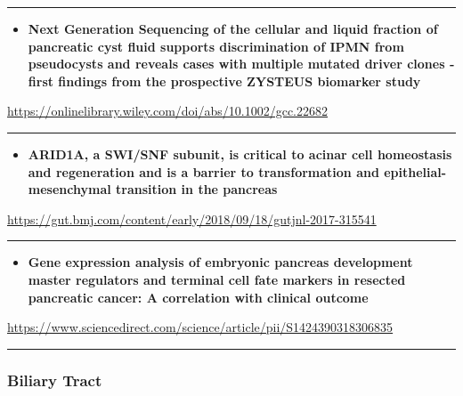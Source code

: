 \documentclass[]{article}
\providecommand{\tightlist}{%
  \setlength{\itemsep}{0pt}\setlength{\parskip}{0pt}}
\begin{document}
{}

{}

\begin{center}\rule{0.5\linewidth}{\linethickness}\end{center}

\begin{itemize}
\tightlist
\item
  \textbf{Next Generation Sequencing of the cellular and liquid fraction
  of pancreatic cyst fluid supports discrimination of IPMN from
  pseudocysts and reveals cases with multiple mutated driver clones ‐
  first findings from the prospective ZYSTEUS biomarker study}
\end{itemize}

\url{https://onlinelibrary.wiley.com/doi/abs/10.1002/gcc.22682}

\begin{center}\rule{0.5\linewidth}{\linethickness}\end{center}

\begin{itemize}
\tightlist
\item
  \textbf{ARID1A, a SWI/SNF subunit, is critical to acinar cell
  homeostasis and regeneration and is a barrier to transformation and
  epithelial-mesenchymal transition in the pancreas}
\end{itemize}

\url{https://gut.bmj.com/content/early/2018/09/18/gutjnl-2017-315541}

\begin{center}\rule{0.5\linewidth}{\linethickness}\end{center}

\begin{itemize}
\tightlist
\item
  \textbf{Gene expression analysis of embryonic pancreas development
  master regulators and terminal cell fate markers in resected
  pancreatic cancer: A correlation with clinical outcome}
\end{itemize}

\url{https://www.sciencedirect.com/science/article/pii/S1424390318306835}

\begin{center}\rule{0.5\linewidth}{\linethickness}\end{center}

\hypertarget{biliary-tract-2}{%
\subsubsection{Biliary Tract}\label{biliary-tract-2}}
\end{document}
